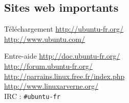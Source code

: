 \documentclass{beamer}
\begin{document}
\subsection{Sites web importants}
\begin{frame}

	{}
	\begin{block}{T\'el\'echargement}
	\url{http://ubuntu-fr.org/}\\
	\url{http://www.ubuntu.com/}
	\end{block}
	\begin{block}{Entre-aide}
	\url{http://doc.ubuntu-fr.org/}\\
	\url{http://forum.ubuntu-fr.org/}\\
	\url{http://parrains.linux.free.fr/index.php}\\
	\url{http://www.linuxarverne.org/}\\
	IRC : {\tt \#{}ubuntu-fr}
	\end{block}
\end{frame}
\end{document}

